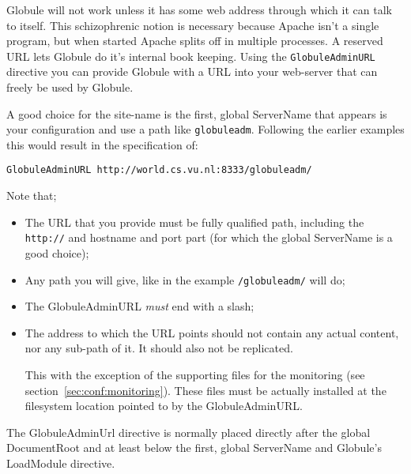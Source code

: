 \documentclass[10pt,a4paper]{article}
\makeatletter
\newenvironment{p}{\@open{P}{}}{\@close{P}}
\newenvironment{p}{}{\par}
\makeatother
\begin{document}
\begin{p}
Globule will not work unless it has some web address through which it can talk
to itself.  This schizophrenic notion is necessary because Apache isn't a
single program, but when started Apache splits off in multiple processes.  A
reserved URL lets Globule do it's internal book keeping.  Using the
\texttt{GlobuleAdminURL} directive you can provide Globule with a URL into
your web-server that can freely be used by Globule.
\end{p}

\begin{p}
A good choice for the site-name is the first, global ServerName that appears
is your configuration and use a path like \verb!globuleadm!.  Following the
earlier examples this would result in the specification of:
\end{p}

\begin{Verbatim}
GlobuleAdminURL http://world.cs.vu.nl:8333/globuleadm/
\end{Verbatim}

\begin{p}
Note that;
\begin{itemize}
\item The URL that you provide must be fully qualified path, including the
\verb!http://! and hostname and port part (for which the global ServerName is
a good choice);

\item Any path you will give, like in the example \verb!/globuleadm/! will do;

\item The GlobuleAdminURL \emph{must} end with a slash;

\item The address to which the URL points should not contain any actual
content, nor any sub-path of it.  It should also not be replicated.

This with the exception of the supporting files for the monitoring (see
section~\ref{sec:conf:monitoring}).  These files must be actually installed at
the filesystem location pointed to by the GlobuleAdminURL.
\end{itemize}
\end{p}

\begin{p}
The GlobuleAdminUrl directive is normally placed directly after the global
DocumentRoot and at least below the first, global ServerName and Globule's
LoadModule directive.
\end{p}
\end{document}

